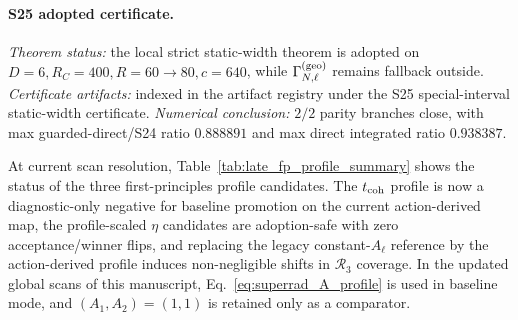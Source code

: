 \documentclass[aps,prd,onecolumn,notitlepage,nofootinbib,superscriptaddress,11pt,floatfix]{revtex4-2}
\begin{document}
\paragraph{S25 adopted certificate.}
\emph{Theorem status:} the local strict static-width theorem is adopted on \(D=6,R_C=400,R=60\to80,c=640\), while \(\Gamma_{N,\ell}^{(\rm geo)}\) remains fallback outside.
\emph{Certificate artifacts:} indexed in the artifact registry under the S25 special-interval static-width certificate.
\emph{Numerical conclusion:} \(2/2\) parity branches close, with max guarded-direct/S24 ratio \(0.888891\) and max direct integrated ratio \(0.938387\).

At current scan resolution, Table~\ref{tab:late_fp_profile_summary} shows the status of the three first-principles profile candidates.  The $t_{\rm coh}$ profile is now a diagnostic-only negative for baseline promotion on the current action-derived map, the profile-scaled $\eta$ candidates are adoption-safe with zero acceptance/winner flips, and replacing the legacy constant-$A_\ell$ reference by the action-derived profile induces non-negligible shifts in $\mathcal{R}_3$ coverage. In the updated global scans of this manuscript, Eq.~\eqref{eq:superrad_A_profile} is used in baseline mode, and $(A_1,A_2)=(1,1)$ is retained only as a comparator.
\end{document}

